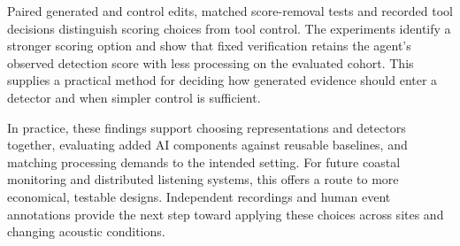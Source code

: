 \documentclass[11pt,letterpaper]{article}
\begin{document}
Paired generated and control edits, matched score-removal tests and recorded tool decisions distinguish scoring choices from tool control. The experiments identify a stronger scoring option and show that fixed verification retains the agent's observed detection score with less processing on the evaluated cohort. This supplies a practical method for deciding how generated evidence should enter a detector and when simpler control is sufficient.\par

In practice, these findings support choosing representations and detectors together, evaluating added AI components against reusable baselines, and matching processing demands to the intended setting. For future coastal monitoring and distributed listening systems, this offers a route to more economical, testable designs. Independent recordings and human event annotations provide the next step toward applying these choices across sites and changing acoustic conditions.\par

{\fontsize{9}{11}\selectfont





}
\end{document}
